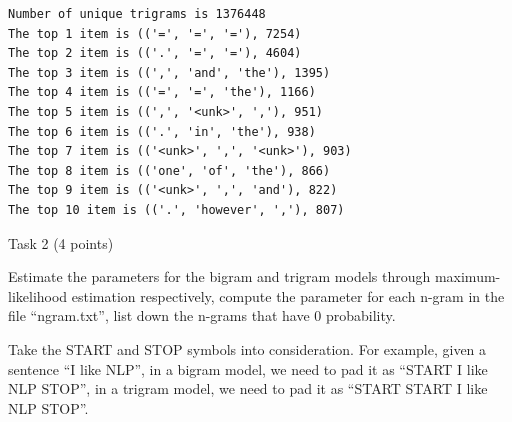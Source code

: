 \documentclass[11pt]{article}
\begin{document}
    \begin{Verbatim}[commandchars=\\\{\}]
Number of unique trigrams is 1376448
The top 1 item is (('=', '=', '='), 7254)
The top 2 item is (('.', '=', '='), 4604)
The top 3 item is ((',', 'and', 'the'), 1395)
The top 4 item is (('=', '=', 'the'), 1166)
The top 5 item is ((',', '<unk>', ','), 951)
The top 6 item is (('.', 'in', 'the'), 938)
The top 7 item is (('<unk>', ',', '<unk>'), 903)
The top 8 item is (('one', 'of', 'the'), 866)
The top 9 item is (('<unk>', ',', 'and'), 822)
The top 10 item is (('.', 'however', ','), 807)

    \end{Verbatim}

    Task 2 (4 points)

Estimate the parameters for the bigram and trigram models through
maximum-likelihood estimation respectively, compute the parameter for
each n-gram in the file ``ngram.txt'', list down the n-grams that have 0
probability.

Take the START and STOP symbols into consideration. For example, given a
sentence ``I like NLP'', in a bigram model, we need to pad it as ``START
I like NLP STOP'', in a trigram model, we need to pad it as ``START
START I like NLP STOP''.
\end{document}
